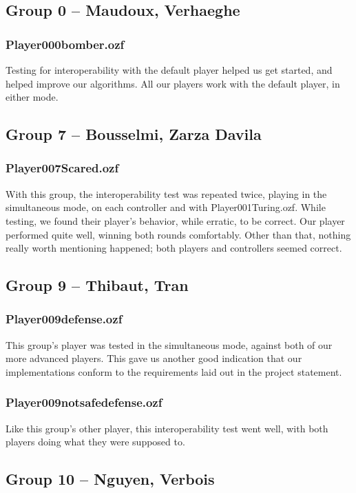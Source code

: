 \documentclass[12pt,journal]{IEEEtran}
\newcommand{\ntt}{\normalfont\ttfamily}
\newcommand{\fn}[1]{{\protect\ntt#1}}
\begin{document}
\subsection{Group 0 -- Maudoux, Verhaeghe}
\subsubsection{\fn{Player000bomber.ozf}}
Testing for interoperability with the default player helped us get started, and helped improve our algorithms.
All our players work with the default player, in either mode.

\subsection{Group 7 -- Bousselmi, Zarza Davila}
\subsubsection{\fn{Player007Scared.ozf}}
With this group, the interoperability test was repeated twice, playing in the simultaneous mode, on each controller and with \fn{Player001Turing.ozf}.
While testing, we found their player's behavior, while erratic, to be correct.
Our player performed quite well, winning both rounds comfortably.
Other than that, nothing really worth mentioning happened; both players and controllers seemed correct.

\subsection{Group 9 -- Thibaut, Tran}
\subsubsection{\fn{Player009defense.ozf}}
This group's player was tested in the simultaneous mode, against both of our more advanced players.
This gave us another good indication that our implementations conform to the requirements laid out in the project statement.
\subsubsection{\fn{Player009notsafedefense.ozf}}
Like this group's other player, this interoperability test went well, with both players doing what they were supposed to.

\subsection{Group 10 -- Nguyen, Verbois}
\end{document}
